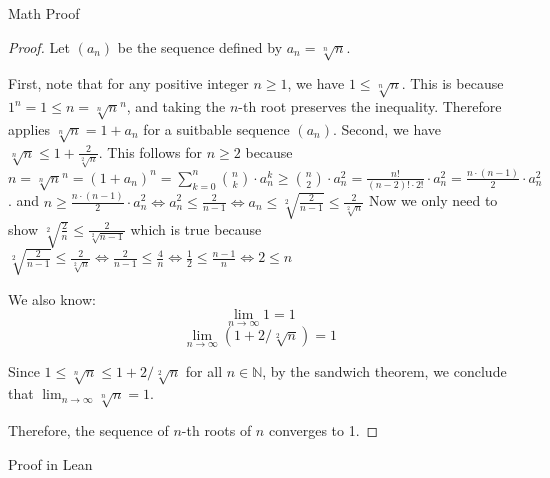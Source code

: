 \documentclass{beamer}
\begin{document}
\begin{frame}{Math Proof}
    \begin{proof}
        Let $(a_n)$ be the sequence defined by $a_n = \sqrt[n]{n}$.

        First, note that for any positive integer $n \geq 1$, we have $1 \leq \sqrt[n]{n}$. This is because $1^n = 1 \leq n = \sqrt[n]{n}^n$, and taking the $n$-th root preserves the inequality. Therefore applies $\sqrt[n]{n} = 1 + a_n$ for a suitbable sequence $(a_n)$.
        Second, we have $\sqrt[n]{n} \leq 1 + \frac{2}{\sqrt[2]{n}}$. This follows for $n \geq 2$ because $n = \sqrt[n]{n}^n = (1 + a_n)^n = \sum_{k=0}^{n} \binom{n}{k} \cdot a_n^k \geq \binom{n}{2} \cdot a_n^2 = \frac{n!}{(n-2)! \cdot 2!} \cdot a_n^2 = \frac{n \cdot (n-1)}{2} \cdot a_n^2$. 
        and $n \geq \frac{n \cdot (n-1)}{2} \cdot a_n^2 \Leftrightarrow a_n^2 \leq \frac{2}{n-1} \Leftrightarrow a_n \leq \sqrt[2]{\frac{2}{n-1}} \leq \frac{2}{\sqrt[2]{n}}$
        Now we only need to show $\sqrt[2]{\frac{2}{n}} \leq \frac{2}{\sqrt[2]{n-1}}$ which is true because $\sqrt[2]{\frac{2}{n-1}} \leq \frac{2}{\sqrt[2]{n}} \Leftrightarrow \frac{2}{n-1} \leq \frac{4}{n} \Leftrightarrow \frac{1}{2} \leq \frac{n-1}{n} \Leftrightarrow 2 \leq n$

       We also know:
        \[
        \lim_{n \to \infty} 1 = 1
        \]
        \[
        \lim_{n \to \infty} (1 + 2 / \sqrt[2]{n}) = 1
        \]

        Since $1 \leq \sqrt[n]{n} \leq 1 + 2 / \sqrt[2]{n}$ for all $n \in \mathbb{N}$, by the sandwich theorem, we conclude that $\lim_{n \to \infty} \sqrt[n]{n} = 1$.

        Therefore, the sequence of $n$-th roots of $n$ converges to 1.

    \end{proof}

\end{frame}

\begin{frame}{Proof in Lean}
\end{frame}
\end{document}
